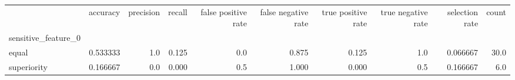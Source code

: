 \begin{tabular}{lrrrrrrrrr}
\toprule
{} &  accuracy &  precision &  recall &  false positive rate &  false negative rate &  true positive rate &  true negative rate &  selection rate &  count \\
sensitive\_feature\_0 &           &            &         &                      &                      &                     &                     &                 &        \\
\midrule
equal               &  0.533333 &        1.0 &   0.125 &                  0.0 &                0.875 &               0.125 &                 1.0 &        0.066667 &   30.0 \\
superiority         &  0.166667 &        0.0 &   0.000 &                  0.5 &                1.000 &               0.000 &                 0.5 &        0.166667 &    6.0 \\
\bottomrule
\end{tabular}
